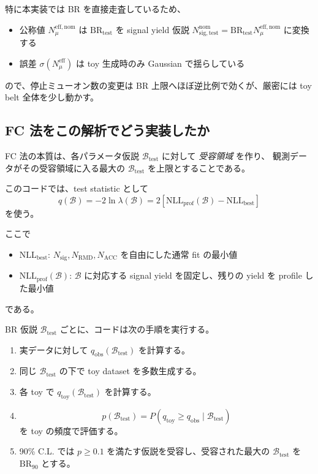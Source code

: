 \documentclass[a4paper,11pt]{jsarticle}
\begin{document}
特に本実装では BR を直接走査しているため、
\begin{itemize}
  \item 公称値 \(N_{\mu}^{\mathrm{eff,nom}}\) は \(\mathrm{BR}_{\mathrm{test}}\) を signal yield 仮説 \(N_{\mathrm{sig,test}}^{\mathrm{nom}}=\mathrm{BR}_{\mathrm{test}}N_{\mu}^{\mathrm{eff,nom}}\) に変換する
  \item 誤差 \(\sigma(N_{\mu}^{\mathrm{eff}})\) は toy 生成時のみ Gaussian で揺らしている
\end{itemize}
ので、停止ミューオン数の変更は BR 上限へほぼ逆比例で効くが、厳密には toy belt 全体を少し動かす。

\subsection{FC 法をこの解析でどう実装したか}
FC 法の本質は、各パラメータ仮説 \(\mathcal{B}_{\mathrm{test}}\) に対して
\emph{受容領域} を作り、
観測データがその受容領域に入る最大の \(\mathcal{B}_{\mathrm{test}}\) を上限とすることである。

このコードでは、test statistic として
\begin{equation}
q(\mathcal{B})=-2\ln\lambda(\mathcal{B})
=2\left[
\mathrm{NLL}_{\mathrm{prof}}(\mathcal{B})
-\mathrm{NLL}_{\mathrm{best}}
\right]
\end{equation}
を使う。

ここで
\begin{itemize}
  \item \(\mathrm{NLL}_{\mathrm{best}}\): \(N_{\mathrm{sig}},N_{\mathrm{RMD}},N_{\mathrm{ACC}}\) を自由にした通常 fit の最小値
  \item \(\mathrm{NLL}_{\mathrm{prof}}(\mathcal{B})\): \(\mathcal{B}\) に対応する signal yield を固定し、残りの yield を profile した最小値
\end{itemize}
である。

BR 仮説 \(\mathcal{B}_{\mathrm{test}}\) ごとに、コードは次の手順を実行する。
\begin{enumerate}
  \item 実データに対して \(q_{\mathrm{obs}}(\mathcal{B}_{\mathrm{test}})\) を計算する。
  \item 同じ \(\mathcal{B}_{\mathrm{test}}\) の下で toy dataset を多数生成する。
  \item 各 toy で \(q_{\mathrm{toy}}(\mathcal{B}_{\mathrm{test}})\) を計算する。
  \item
  \[
  p(\mathcal{B}_{\mathrm{test}})
  =
  P\!\left(
  q_{\mathrm{toy}}\ge q_{\mathrm{obs}}
  \mid \mathcal{B}_{\mathrm{test}}
  \right)
  \]
  を toy の頻度で評価する。
  \item 90\% C.L. では \(p\ge 0.1\) を満たす仮説を受容し、受容された最大の \(\mathcal{B}_{\mathrm{test}}\) を \(\mathrm{BR}_{90}\) とする。
\end{enumerate}
\end{document}

